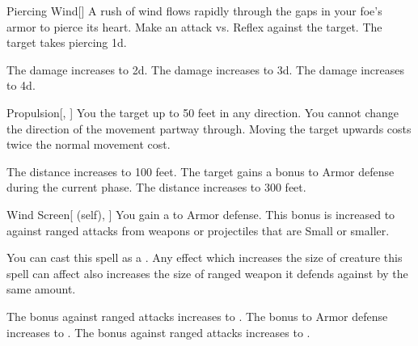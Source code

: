 \lowercase{\hypertarget{spell:Piercing Wind}{}}\label{spell:Piercing Wind}
\begin{freeability}[Rank 1]{\hypertarget{spell:Piercing Wind}{Piercing Wind}}[]
A rush of wind flows rapidly through the gaps in your foe's armor to pierce its heart.
Make an attack vs. Reflex against the target.
\hit The target takes piercing  \plus1d.

\rankline
{} The damage increases to  \plus2d.
 The damage increases to  \plus3d.
 The damage increases to  \plus4d.
\end{freeability}
\vspace{0.25em}



\lowercase{\hypertarget{spell:Propulsion}{}}\label{spell:Propulsion}
\begin{freeability}[Rank 1]{\hypertarget{spell:Propulsion}{Propulsion}}[, ]
You  the target up to 50 feet in any direction.
You cannot change the direction of the movement partway through.
Moving the target upwards costs twice the normal movement cost.

\rankline
{} The distance increases to 100 feet.
 The target gains a  bonus to Armor defense during the current phase.
 The distance increases to 300 feet.
\end{freeability}
\vspace{0.25em}



\lowercase{\hypertarget{spell:Wind Screen}{}}\label{spell:Wind Screen}
\begin{attuneability}[Rank 1]{\hypertarget{spell:Wind Screen}{Wind Screen}}[ (self), ]
You gain a   to Armor defense.
This bonus is increased to  against  ranged attacks from weapons or projectiles that are Small or smaller.

You can cast this spell as a .
Any effect which increases the size of creature this spell can affect also increases the size of ranged weapon it defends against by the same amount.

\rankline
{} The bonus against ranged attacks increases to .
 The bonus to Armor defense increases to .
 The bonus against ranged attacks increases to .
\end{attuneability}
\vspace{0.25em}



